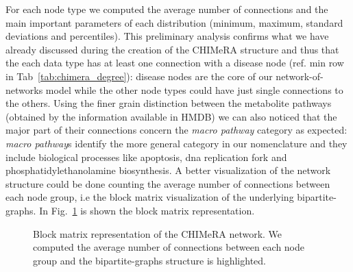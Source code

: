 \documentclass{standalone}
\begin{document}
For each node type we computed the average number of connections and the main important parameters of each distribution (minimum, maximum, standard deviations and percentiles).
This preliminary analysis confirms what we have already discussed during the creation of the \textsf{CHIMeRA} structure and thus that the each data type has at least one connection with a disease node (ref. min row in Tab~\ref{tab:chimera_degree}): disease nodes are the core of our network-of-networks model while the other node types could have just single connections to the others.
Using the finer grain distinction between the metabolite pathways (obtained by the information available in HMDB) we can also noticed that the major part of their connections concern the \emph{macro pathway} category as expected: \emph{macro pathway}s identify the more general category in our nomenclature and they include biological processes like \textsf{apoptosis}, \textsf{dna replication fork} and \textsf{phosphatidylethanolamine biosynthesis}.
A better visualization of the network structure could be done counting the average number of connections between each node group, i.e the block matrix visualization of the underlying bipartite-graphs.
In Fig.~\ref{fig:chimera_bipartite} is shown the block matrix representation.

\begin{figure}[htbp]
\centering
\def\svgwidth{\textwidth}

\caption{Block matrix representation of the \textsf{CHIMeRA} network.
We computed the average number of connections between each node group and the bipartite-graphs structure is highlighted.
}
\label{fig:chimera_bipartite}
\end{figure}
\end{document}
